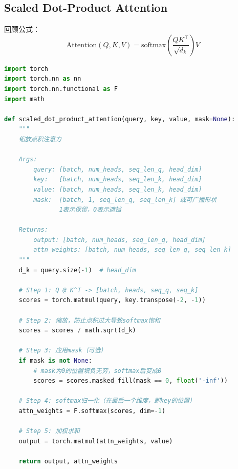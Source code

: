 \subsection*{Scaled Dot-Product Attention}


回顾公式：
\begin{equation}
    \text{Attention}(Q, K, V) = \text{softmax}\left(\frac{QK^\top}{\sqrt{d_k}}\right) V
\end{equation}

\begin{lstlisting}[language=Python, caption=Scaled Dot-Product Attention]
import torch
import torch.nn as nn
import torch.nn.functional as F
import math

def scaled_dot_product_attention(query, key, value, mask=None):
    """
    缩放点积注意力
    
    Args:
        query: [batch, num_heads, seq_len_q, head_dim]
        key:   [batch, num_heads, seq_len_k, head_dim]
        value: [batch, num_heads, seq_len_k, head_dim]
        mask:  [batch, 1, seq_len_q, seq_len_k] 或可广播形状
               1表示保留，0表示遮挡
    
    Returns:
        output: [batch, num_heads, seq_len_q, head_dim]
        attn_weights: [batch, num_heads, seq_len_q, seq_len_k]
    """
    d_k = query.size(-1)  # head_dim
    
    # Step 1: Q @ K^T -> [batch, heads, seq_q, seq_k]
    scores = torch.matmul(query, key.transpose(-2, -1))
    
    # Step 2: 缩放，防止点积过大导致softmax饱和
    scores = scores / math.sqrt(d_k)
    
    # Step 3: 应用mask（可选）
    if mask is not None:
        # mask为0的位置填负无穷，softmax后变成0
        scores = scores.masked_fill(mask == 0, float('-inf'))
    
    # Step 4: softmax归一化（在最后一个维度，即key的位置）
    attn_weights = F.softmax(scores, dim=-1)
    
    # Step 5: 加权求和
    output = torch.matmul(attn_weights, value)
    
    return output, attn_weights
\end{lstlisting}

